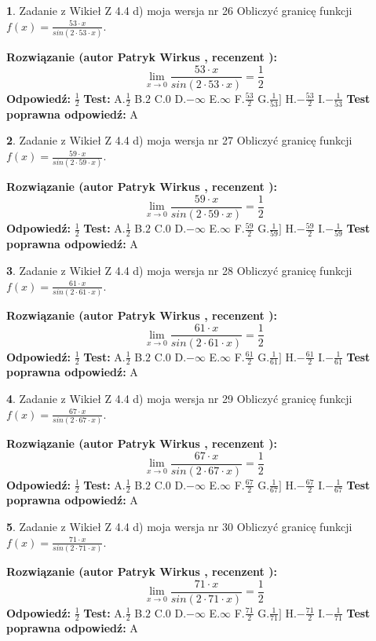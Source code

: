 \documentclass[12pt, a4paper]{article}
\theoremstyle{definition} %
\newtheorem{zad}{}
\newcommand{\zadStart}[1]{\begin{zad}#1\newline}
\newcommand{\zadStop}{\end{zad}}
\newcommand{\rozwStart}[2]{\noindent \textbf{Rozwiązanie (autor #1 , recenzent #2): }\newline}
\newcommand{\rozwStop}{\newline}
\newcommand{\odpStart}{\noindent \textbf{Odpowiedź:}\newline}
\newcommand{\odpStop}{\newline}
\newcommand{\testStart}{\noindent \textbf{Test:}\newline}
\newcommand{\testStop}{\newline}
\newcommand{\kluczStart}{\noindent \textbf{Test poprawna odpowiedź:}\newline}
\newcommand{\kluczStop}{\newline}
\begin{document}
\zadStart{Zadanie z Wikieł Z 4.4 d) moja wersja nr 26}
Obliczyć granicę funkcji $f(x)=\frac{53\cdot x}{sin(2 \cdot53\cdot x)}$.
\zadStop
\rozwStart{Patryk Wirkus}{}
$$\lim\limits_{x\to 0}\frac{53\cdot x}{sin(2 \cdot53\cdot x)}=\frac{1}{2}$$
\rozwStop
\odpStart
$\frac{1}{2}$
\odpStop
\testStart
A.$\frac{1}{2}$
B.$2$
C.$0$
D.$-\infty$
E.$\infty$
F.$\frac{53}{2}$
G.$\frac{1}{53}]$
H.$-\frac{53}{2}$
I.$-\frac{1}{53}$
\testStop
\kluczStart
A
\kluczStop



\zadStart{Zadanie z Wikieł Z 4.4 d) moja wersja nr 27}
Obliczyć granicę funkcji $f(x)=\frac{59\cdot x}{sin(2 \cdot59\cdot x)}$.
\zadStop
\rozwStart{Patryk Wirkus}{}
$$\lim\limits_{x\to 0}\frac{59\cdot x}{sin(2 \cdot59\cdot x)}=\frac{1}{2}$$
\rozwStop
\odpStart
$\frac{1}{2}$
\odpStop
\testStart
A.$\frac{1}{2}$
B.$2$
C.$0$
D.$-\infty$
E.$\infty$
F.$\frac{59}{2}$
G.$\frac{1}{59}]$
H.$-\frac{59}{2}$
I.$-\frac{1}{59}$
\testStop
\kluczStart
A
\kluczStop



\zadStart{Zadanie z Wikieł Z 4.4 d) moja wersja nr 28}
Obliczyć granicę funkcji $f(x)=\frac{61\cdot x}{sin(2 \cdot61\cdot x)}$.
\zadStop
\rozwStart{Patryk Wirkus}{}
$$\lim\limits_{x\to 0}\frac{61\cdot x}{sin(2 \cdot61\cdot x)}=\frac{1}{2}$$
\rozwStop
\odpStart
$\frac{1}{2}$
\odpStop
\testStart
A.$\frac{1}{2}$
B.$2$
C.$0$
D.$-\infty$
E.$\infty$
F.$\frac{61}{2}$
G.$\frac{1}{61}]$
H.$-\frac{61}{2}$
I.$-\frac{1}{61}$
\testStop
\kluczStart
A
\kluczStop



\zadStart{Zadanie z Wikieł Z 4.4 d) moja wersja nr 29}
Obliczyć granicę funkcji $f(x)=\frac{67\cdot x}{sin(2 \cdot67\cdot x)}$.
\zadStop
\rozwStart{Patryk Wirkus}{}
$$\lim\limits_{x\to 0}\frac{67\cdot x}{sin(2 \cdot67\cdot x)}=\frac{1}{2}$$
\rozwStop
\odpStart
$\frac{1}{2}$
\odpStop
\testStart
A.$\frac{1}{2}$
B.$2$
C.$0$
D.$-\infty$
E.$\infty$
F.$\frac{67}{2}$
G.$\frac{1}{67}]$
H.$-\frac{67}{2}$
I.$-\frac{1}{67}$
\testStop
\kluczStart
A
\kluczStop



\zadStart{Zadanie z Wikieł Z 4.4 d) moja wersja nr 30}
Obliczyć granicę funkcji $f(x)=\frac{71\cdot x}{sin(2 \cdot71\cdot x)}$.
\zadStop
\rozwStart{Patryk Wirkus}{}
$$\lim\limits_{x\to 0}\frac{71\cdot x}{sin(2 \cdot71\cdot x)}=\frac{1}{2}$$
\rozwStop
\odpStart
$\frac{1}{2}$
\odpStop
\testStart
A.$\frac{1}{2}$
B.$2$
C.$0$
D.$-\infty$
E.$\infty$
F.$\frac{71}{2}$
G.$\frac{1}{71}]$
H.$-\frac{71}{2}$
I.$-\frac{1}{71}$
\testStop
\kluczStart
A
\kluczStop
\end{document}
